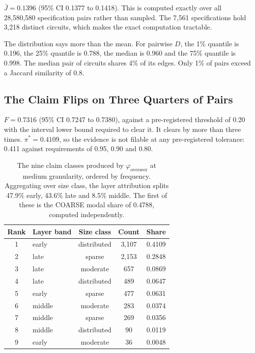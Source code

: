 \documentclass[letterpaper]{article} %
\begin{document}
$\bar{J} = 0.1396$ (95\% CI 0.1377 to 0.1418). This is computed exactly over all
28{,}580{,}580 specification pairs rather than sampled. The 7{,}561
specifications hold 3{,}218 distinct circuits, which makes the exact computation
tractable.

The distribution says more than the mean. For pairwise $D$, the 1\% quantile is
0.196, the 25\% quantile is 0.788, the median is 0.960 and the 75\% quantile is
0.998. The median pair of circuits shares 4\% of its edges. Only 1\% of pairs
exceed a Jaccard similarity of 0.8.

\subsection{The Claim Flips on Three Quarters of Pairs}

$F = 0.7316$ (95\% CI 0.7247 to 0.7380), against a pre-registered threshold of
0.20 with the interval lower bound required to clear it. It clears by more than
three times. $\pi^{*} = 0.4109$, so the evidence is not filable at any
pre-registered tolerance: 0.411 against requirements of 0.95, 0.90 and 0.80.

\begin{table}[t]
\centering
\caption{The nine claim classes produced by $\varphi_{\text{overseer}}$ at
medium granularity, ordered by frequency. Aggregating over size class, the layer
attribution splits 47.9\% early, 43.6\% late and 8.5\% middle. The first of
these is the COARSE modal share of 0.4788, computed independently.}
\label{tab:classes}
\begin{tabular}{clccc}
\toprule
Rank & Layer band & Size class & Count & Share \\
\midrule
1 & early & distributed & 3{,}107 & 0.4109 \\
2 & late & sparse & 2{,}153 & 0.2848 \\
3 & late & moderate & 657 & 0.0869 \\
4 & late & distributed & 489 & 0.0647 \\
5 & early & sparse & 477 & 0.0631 \\
6 & middle & moderate & 283 & 0.0374 \\
7 & middle & sparse & 269 & 0.0356 \\
8 & middle & distributed & 90 & 0.0119 \\
9 & early & moderate & 36 & 0.0048 \\
\bottomrule
\end{tabular}
\end{table}
\end{document}
